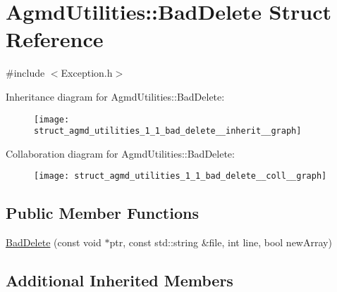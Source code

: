 \hypertarget{struct_agmd_utilities_1_1_bad_delete}{\section{Agmd\+Utilities\+:\+:Bad\+Delete Struct Reference}
\label{struct_agmd_utilities_1_1_bad_delete}
}


{\ttfamily \#include $<$Exception.\+h$>$}



Inheritance diagram for Agmd\+Utilities\+:\+:Bad\+Delete\+:\nopagebreak
\begin{figure}[H]
\begin{center}
\leavevmode
\texttt{[image: struct\_agmd\_utilities\_1\_1\_bad\_delete\_\_inherit\_\_graph]}
\end{center}
\end{figure}


Collaboration diagram for Agmd\+Utilities\+:\+:Bad\+Delete\+:\nopagebreak
\begin{figure}[H]
\begin{center}
\leavevmode
\texttt{[image: struct\_agmd\_utilities\_1\_1\_bad\_delete\_\_coll\_\_graph]}
\end{center}
\end{figure}
\subsection*{Public Member Functions}
\begin{DoxyCompactItemize}
\item 
\hyperlink{struct_agmd_utilities_1_1_bad_delete_aa64cfde60c10d4535c99c4a361107e8a}{Bad\+Delete} (const void $\ast$ptr, const std\+::string \&file, int line, bool new\+Array)
\end{DoxyCompactItemize}
\subsection*{Additional Inherited Members}


